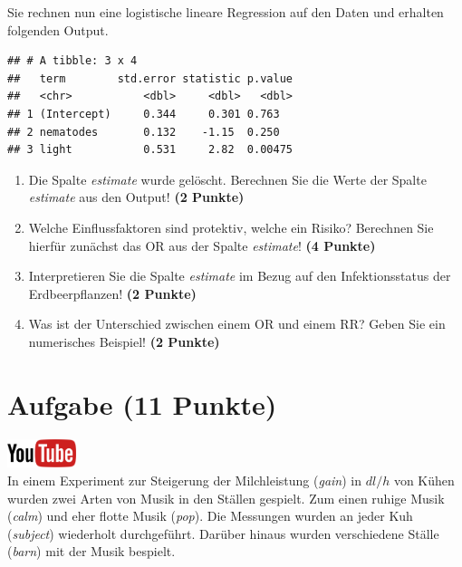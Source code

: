 \documentclass[a4paper, 10pt]{scrartcl}\usepackage[]{graphicx}\usepackage[]{xcolor}
\makeatletter
\newenvironment{kframe}{%
 \def\at@end@of@kframe{}%
 \ifinner\ifhmode%
  \def\at@end@of@kframe{\end{minipage}}%
  \begin{minipage}{\columnwidth}%
 \fi\fi%
 \def\FrameCommand##1{\hskip\@totalleftmargin \hskip-\fboxsep
 \colorbox{shadecolor}{##1}\hskip-\fboxsep
     \hskip-\linewidth \hskip-\@totalleftmargin \hskip\columnwidth}%
 \MakeFramed {\advance\hsize-\width
   \@totalleftmargin\z@ \linewidth\hsize
   \@setminipage}}%
 {\par\unskip\endMakeFramed%
 \at@end@of@kframe}
\newenvironment{knitrout}{}{} %
\makeatother
\begin{document}
Sie rechnen nun eine logistische lineare Regression auf den Daten und erhalten
folgenden \Rlogo Output.

\begin{knitrout}
\color{fgcolor}\begin{kframe}
\begin{verbatim}
## # A tibble: 3 x 4
##   term        std.error statistic p.value
##   <chr>           <dbl>     <dbl>   <dbl>
## 1 (Intercept)     0.344     0.301 0.763  
## 2 nematodes       0.132    -1.15  0.250  
## 3 light           0.531     2.82  0.00475
\end{verbatim}
\end{kframe}
\end{knitrout}


\begin{enumerate}
\item Die Spalte \textit{estimate} wurde gel{\"o}scht. Berechnen Sie die Werte
  der Spalte \textit{estimate} aus den \Rlogo Output! \textbf{(2 Punkte)}
\item Welche Einflussfaktoren sind protektiv, welche ein Risiko? Berechnen
  Sie hierf{\"u}r zun{\"a}chst das OR aus der Spalte \textit{estimate}! \textbf{(4 Punkte)}
\item Interpretieren Sie die Spalte \textit{estimate} im Bezug auf den
  Infektionsstatus der Erdbeerpflanzen! \textbf{(2 Punkte)}
\item Was ist der Unterschied zwischen einem OR und einem RR? Geben Sie ein
  numerisches Beispiel! \textbf{(2 Punkte)}
\end{enumerate}
 
\clearpage

\section{Aufgabe \hfill (11 Punkte)}

\hfill\href{https://youtu.be/ysai7umvPoA}{\includegraphics[width =
  2cm]{img/youtube}}\\[1Ex]


In einem Experiment zur Steigerung der Milchleistung (\textit{gain}) in $dl/h$ von
K{\"u}hen wurden zwei Arten von Musik in den St{\"a}llen gespielt. Zum einen ruhige
Musik (\textit{calm}) und eher flotte Musik (\textit{pop}). Die Messungen
wurden an jeder Kuh (\textit{subject}) wiederholt durchgef{\"u}hrt. Dar{\"u}ber
hinaus wurden verschiedene St{\"a}lle (\textit{barn}) mit der Musik bespielt.
\end{document}
